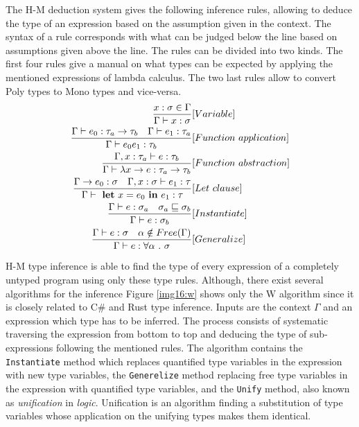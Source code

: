 \par
The H-M deduction system gives the following inference rules, allowing to deduce the type of an expression based on the assumption given in the context. 
The syntax of a rule corresponds with what can be judged below the line based on assumptions given above the line.
The rules can be divided into two kinds.
The first four rules give a manual on what types can be expected by applying the mentioned expressions of lambda calculus. 
The two last rules allow to convert Poly types to Mono types and vice-versa.
\begin{align*}
\frac{x : \sigma \in \Gamma}{\Gamma \vdash x : \sigma}&[Variable]\\
\frac{\Gamma \vdash e_0 : \tau_a \rightarrow \tau_b\ \ \ \Gamma \vdash e_1 : \tau_a}{\Gamma \vdash e_0 e_1 : \tau_b}&[Function\ application]\\
\frac{\Gamma, x : \tau_a \vdash e : \tau_b}{\Gamma \vdash \lambda x \rightarrow e : \tau_a \rightarrow \tau_b}&[Function\ abstraction]\\
\frac{\Gamma \rightarrow e_0 : \sigma \ \ \ \Gamma , x : \sigma \vdash e_1 : \tau}{\Gamma \vdash\ \text{\textbf{let}}\ x = e_0\ \text{\textbf{in}}\ e_1 : \tau}&[Let\ clause]\\
\frac{\Gamma \vdash e : \sigma_a \ \ \ \sigma_a \sqsubseteq \sigma_b}{\Gamma \vdash e : \sigma_b}&[Instantiate]\\
\frac{\Gamma \vdash e : \sigma \ \ \ \alpha \notin Free(\Gamma)}{\Gamma \vdash e : \forall \alpha\ .\ \sigma}&[Generalize]\\
\end{align*}
\par
H-M type inference is able to find the type of every expression of a completely untyped program using only these type rules.
Although, there exist several algorithms for the inference Figure \ref{img16:w} shows only the W algorithm since it is closely related to C\# and Rust type inference.
Inputs are the context $\Gamma$ and an expression which type has to be inferred.
The process consists of systematic traversing the expression from bottom to top and deducing the type of sub-expressions following the mentioned rules.
The algorithm contains the \texttt{Instantiate} method which replaces quantified type variables in the expression with new type variables, the \texttt{Generelize} method replacing free type variables in the expression with quantified type variables, and the \texttt{Unify} method, also known as \textit{unification} in \textit{logic}.
Unification is an algorithm finding a substitution of type variables whose application on the unifying types makes them identical. 
